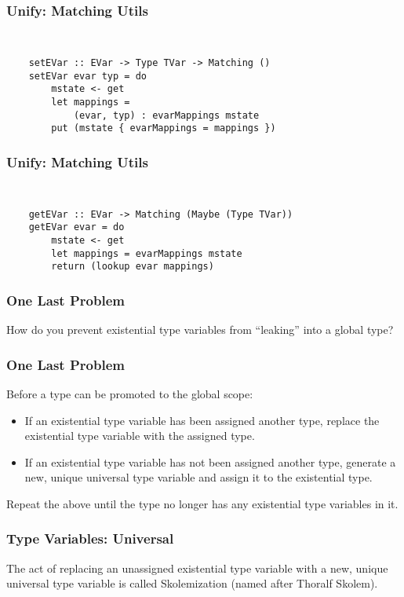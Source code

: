 \documentclass{beamer}
\begin{document}
\begin{frame}[fragile]
\frametitle{Unify: Matching Utils}
\large{
{\tt
\begin{verbatim}
    setEVar :: EVar -> Type TVar -> Matching ()
    setEVar evar typ = do
        mstate <- get
        let mappings =
            (evar, typ) : evarMappings mstate
        put (mstate { evarMappings = mappings })
\end{verbatim}
}}
\end{frame}

\begin{frame}[fragile]
\frametitle{Unify: Matching Utils}
\large{
{\tt
\begin{verbatim}
    getEVar :: EVar -> Matching (Maybe (Type TVar))
    getEVar evar = do
        mstate <- get
        let mappings = evarMappings mstate
        return (lookup evar mappings)
\end{verbatim}
}}
\end{frame}

\begin{frame}
\frametitle{One Last Problem}
\begin{center}
{\Huge
How do you prevent existential type variables from ``leaking'' into
a global type?}
\end{center}
\end{frame}

\begin{frame}[fragile]
\frametitle{One Last Problem}
Before a type can be promoted to the global scope:
\begin{itemize}
\item If an existential type variable has been assigned another type,
replace the existential type variable with the assigned type.
\item If an existential type variable has not been assigned another type,
generate a new, unique universal type variable and assign it to the
existential type.
\end{itemize}

Repeat the above until the type no longer has any existential type variables
in it.
\end{frame}

\begin{frame}
\frametitle{Type Variables: Universal}
\Large{
\begin{definition}
The act of replacing an unassigned existential type variable with a new,
unique universal type variable is called \alert{Skolemization} (named after
Thoralf Skolem).
\end{definition}
}
\end{frame}
\end{document}
